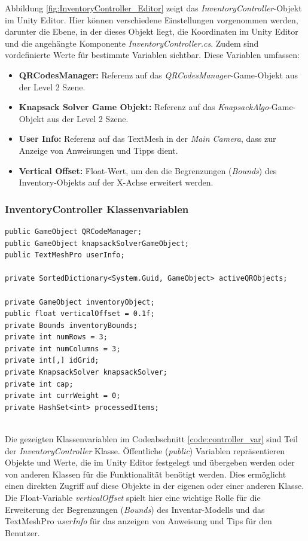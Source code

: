 Abbildung \ref{fig:InventoryController_Editor} zeigt das \textit{InventoryController}-Objekt im Unity Editor. Hier können
verschiedene Einstellungen vorgenommen werden, darunter die Ebene, in der dieses Objekt liegt, die Koordinaten im Unity
Editor und die angehängte Komponente \textit{InventoryController.cs}. Zudem sind vordefinierte Werte für bestimmte Variablen
sichtbar. Diese Variablen umfassen:

\begin{itemize}
    \item \textbf{QRCodesManager:} Referenz auf das \textit{QRCodesManager}-Game-Objekt aus der Level 2 Szene.
    \item \textbf{Knapsack Solver Game Objekt:} Referenz auf das \textit{KnapsackAlgo}-Game-Objekt aus der Level 2 Szene.
    \item \textbf{User Info:} Referenz auf das TextMesh in der \textit{Main Camera}, dass zur Anzeige von Anweisungen und
    Tipps dient.
    \item \textbf{Vertical Offset:} Float-Wert, um den die Begrenzungen (\textit{Bounds}) des Inventory-Objekts auf der
    X-Achse erweitert werden.
\end{itemize}

\subsubsection{InventoryController Klassenvariablen}
\begin{lstlisting}[style=csharp, caption={Klassenvariablen der InventoryController Klasse}, label=code:controller_var]
public GameObject QRCodeManager;
public GameObject knapsackSolverGameObject;
public TextMeshPro userInfo;

private SortedDictionary<System.Guid, GameObject> activeQRObjects;

private GameObject inventoryObject;
public float verticalOffset = 0.1f;
private Bounds inventoryBounds;
private int numRows = 3;
private int numColumns = 3;
private int[,] idGrid;
private KnapsackSolver knapsackSolver;
private int cap;
private int currWeight = 0;
private HashSet<int> processedItems;
\end{lstlisting}\\
Die gezeigten Klassenvariablen im Codeabschnitt \ref{code:controller_var} sind Teil der \textit{InventoryController} Klasse.
Öffentliche (\textit{public}) Variablen repräsentieren Objekte und Werte, die im Unity Editor festgelegt und übergeben
werden oder von anderen Klassen für die Funktionalität benötigt werden. Dies ermöglicht einen direkten Zugriff auf diese
Objekte in der eigenen oder einer anderen Klasse. Die Float-Variable \textit{verticalOffset} spielt hier eine wichtige Rolle
für die Erweiterung der Begrenzungen (\textit{Bounds}) des Inventar-Modells und das TextMeshPro \textit{userInfo} für das
anzeigen von Anweisung und Tips für den Benutzer.

